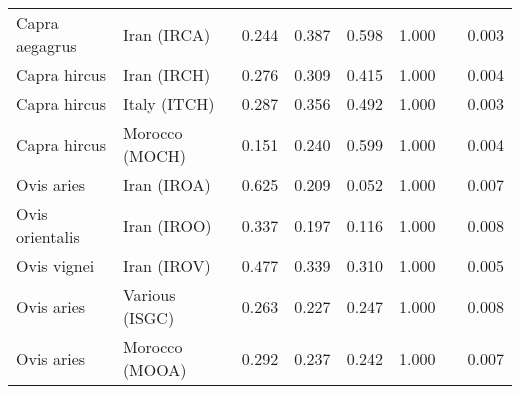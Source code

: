 \begin{center}
\begin{adjustbox}{width = 1\textwidth}
\begin{tabular}{|l|l|r|r|r|r|r|}
      Capra aegagrus &                     Iran (IRCA) &                                              0.244 &                                              0.387 &                0.598 &                                  1.000~~ &              0.003 \\
        Capra hircus &                     Iran (IRCH) &                                              0.276 &                                              0.309 &                0.415 &                                  1.000~~ &              0.004 \\
        Capra hircus &                    Italy (ITCH) &                                              0.287 &                                              0.356 &                0.492 &                                  1.000~~ &              0.003 \\
        Capra hircus &                  Morocco (MOCH) &                                              0.151 &                                              0.240 &                0.599 &                                  1.000~~ &              0.004 \\
          Ovis aries &                     Iran (IROA) &                                              0.625 &                                              0.209 &                0.052 &                                  1.000~~ &              0.007 \\
     Ovis orientalis &                     Iran (IROO) &                                              0.337 &                                              0.197 &                0.116 &                                  1.000~~ &              0.008 \\
         Ovis vignei &                     Iran (IROV) &                                              0.477 &                                              0.339 &                0.310 &                                  1.000~~ &              0.005 \\
          Ovis aries &                  Various (ISGC) &                                              0.263 &                                              0.227 &                0.247 &                                  1.000~~ &              0.008 \\
          Ovis aries &                  Morocco (MOOA) &                                              0.292 &                                              0.237 &                0.242 &                                  1.000~~ &              0.007 \\

\end{tabular}
\end{adjustbox}
\end{center}
